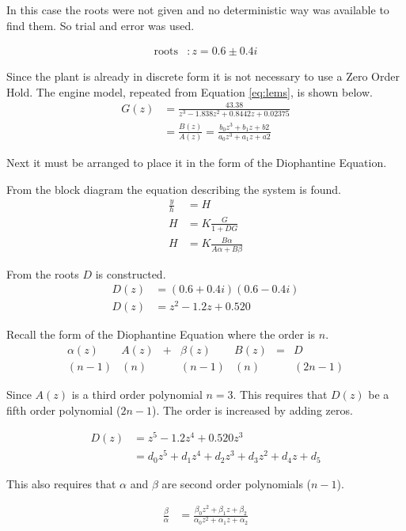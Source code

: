 \documentclass{article}
\begin{document}
In this case the roots were not given and no deterministic way
was available to find them.
So trial and error was used.

\begin{align*}
	\text{roots} &: z = 0.6 \pm 0.4i
\end{align*}

Since the plant is already in discrete form it is not necessary
to use a Zero Order Hold.
The engine model, repeated from Equation \ref{eq:lems}, is shown below.
\begin{align*}
G(z) &= \frac{43.38}{z^3 - 1.838 z^2 + 0.8442 z + 0.02375} \\
	&= \frac{B(z)}{A(z)} = \frac{b_0 z^3 + b_1 z + b2}
								{a_0 z^3 + a_1 z + a2}
\end{align*}

Next it must be arranged to place it in the form of the Diophantine Equation.

From the block diagram the equation describing the system is found.
\begin{align*}
	\frac{y}{h} &= H \\
	H &= K \frac{G}{1 + D G} \\
	H &= K \frac{B \alpha}{A \alpha + B \beta}
\end{align*}

From the roots $D$ is constructed.
\begin{align*}
	D(z) &= (0.6 + 0.4i)(0.6 - 0.4i) \\
	D(z) &= z^2 - 1.2z + 0.520
\end{align*}

Recall the form of the Diophantine Equation where the order is $n$.
\[
\begin{array}{ccccccc}
	\alpha(z) &A(z) &+ &\beta(z) &B(z) &= &D \\
	  (n-1)   &(n)  &  & (n-1)  &(n) & &(2n-1)
\end{array}
\]

Since $A(z)$ is a third order polynomial $n = 3$.
This requires that $D(z)$ be a fifth order polynomial ($2n-1$).
The order is increased by adding zeros.

\begin{align*}
	D(z) &= z^5 - 1.2z^4 + 0.520z^3 \\
		 &= d_0z^5 + d_1z^4 + d_2z^3 + d_3z^2 + d_4z + d_5
\end{align*}

This also requires that $\alpha$ and $\beta$ are
second order polynomials ($n-1$).

\begin{align*}
	\frac{\beta}{\alpha} &= \frac{\beta_0 z^2 + \beta_1 z + \beta_2}
								{\alpha_0 z^2 + \alpha_1 z + \alpha_2}
\end{align*}
\end{document}

